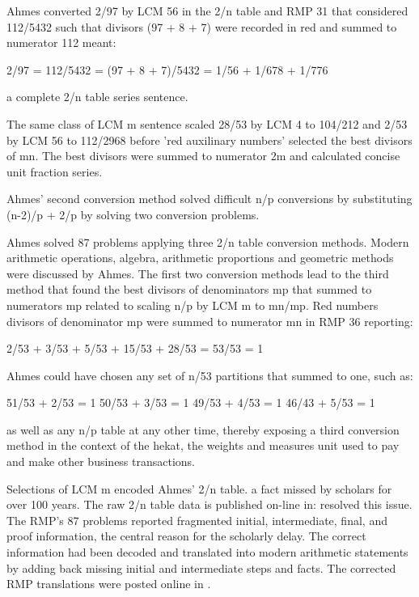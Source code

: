 \documentclass[12pt]{article}
\begin{document}
Ahmes converted 2/97 by LCM 56 in the 2/n table and RMP 31 that considered 112/5432 such that divisors (97 + 8 + 7) were recorded in red and summed to numerator 112 meant:

2/97 = 112/5432 = (97 + 8 + 7)/5432 = 1/56 + 1/678 + 1/776

a complete 2/n table series sentence.

The same class of LCM m sentence scaled 28/53 by LCM 4 to 104/212 and 2/53 by LCM 56 to 112/2968 before 'red auxilinary numbers' selected the best divisors of mn. The best divisors were summed to numerator 2m and calculated concise unit fraction series. 

Ahmes' second conversion method solved difficult n/p conversions by substituting (n-2)/p + 2/p by solving two conversion problems.  

Ahmes solved 87 problems applying three 2/n table conversion methods. Modern arithmetic operations, algebra, arithmetic proportions and geometric methods were discussed by Ahmes. The first two conversion methods lead to the third method that found the best divisors of denominators mp that summed to numerators mp related to scaling n/p by LCM m to mn/mp. Red numbers divisors of denominator mp were summed to numerator mn in RMP 36 reporting:

2/53 + 3/53 + 5/53 +  15/53 + 28/53 = 53/53 = 1

Ahmes could have chosen any set of n/53 partitions that summed to one, such as:

51/53 + 2/53 = 1
50/53 + 3/53 = 1
49/53 + 4/53 = 1
46/43 + 5/53 = 1

as well as any n/p table at any other time, thereby exposing a third conversion method in the context of the hekat, the weights and measures unit used to pay  and make other business transactions.

Selections of LCM m encoded Ahmes' 2/n table. a fact missed by scholars for over 100 years. The raw 2/n table data is published on-line in:  resolved this issue. The RMP's 87 problems reported fragmented initial, intermediate, final, and proof information, the central reason for the scholarly delay. The correct information had been decoded and translated into modern arithmetic statements by adding back missing initial and intermediate steps and facts. The corrected RMP translations were posted online in .
\end{document}
